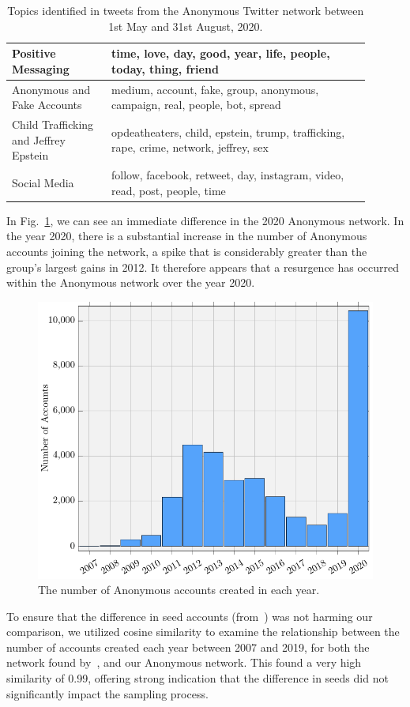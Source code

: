 \documentclass[letterpaper]{article}
\begin{document}
\begin{table}[!ht]
\begin{tabular}{p{0.25\linewidth} >{\raggedright\arraybackslash}p{0.65\linewidth}}
\midrule
Positive Messaging & time, love, day, good, year, life, people, today, thing, friend \\
\midrule
Anonymous and Fake Accounts & medium, account, fake, group, anonymous, campaign, real, people, bot, spread \\
\midrule
Child Trafficking and Jeffrey Epstein & opdeatheaters, child, epstein, trump, trafficking, rape, crime, network, jeffrey, sex \\
\midrule
Social Media & follow, facebook, retweet, day, instagram, video, read, post, people, time \\
\bottomrule
\end{tabular}
\caption{Topics identified in tweets from the Anonymous Twitter network between 1st May and 31st August, 2020.}
\label{table:AnonTopics}
\end{table}

In Fig.~\ref{fig:createDate}, we can see an immediate difference in the 2020 Anonymous network. In the year 2020, there is a substantial increase in the number of Anonymous accounts joining the network, a spike that is considerably greater than the group's largest gains in 2012. It therefore appears that a resurgence has occurred within the Anonymous network over the year 2020.

\begin{figure}[!ht]
\centering
\includegraphics[width=0.6\linewidth]{accounts_created.pdf}
\caption{The number of Anonymous accounts created in each year.}
\label{fig:createDate}
\end{figure}

To ensure that the difference in seed accounts (from~\cite{Jones2020}) was not harming our comparison, we utilized cosine similarity to examine the relationship between the number of accounts created each year between 2007 and 2019, for both the network found by~\citeauthor{Jones2020}, and our Anonymous network. This found a very high similarity of 0.99, offering strong indication that the difference in seeds did not significantly impact the sampling process.
\end{document}
